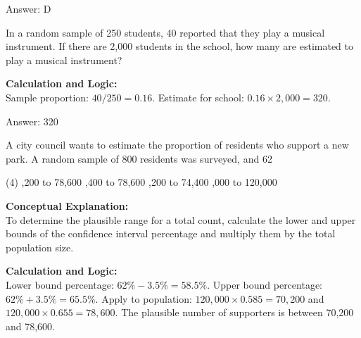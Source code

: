 \documentclass[11pt,paper=a4,answers]{exam}
\begin{document}
\begin{questions}
\begin{solution}
Answer: \colorbox{yellow!100}{D}
\end{solution}

\vspace{60pt}

\question
In a random sample of 250 students, 40 reported that they play a musical instrument. If there are 2,000 students in the school, how many are estimated to play a musical instrument?

\begin{solution}
\textbf{Calculation and Logic:} \\
Sample proportion: $40 / 250 = 0.16$. Estimate for school: $0.16 \times 2,000 = 320$.

\vspace{30pt}

Answer: \colorbox{yellow!100}{320}
\end{solution}


\question
A city council wants to estimate the proportion of residents who support a new park. A random sample of 800 residents was surveyed, and 62%
\begin{tasks}(4)
    ,200 to 78,600
    ,400 to 78,600
    ,200 to 74,400
    ,000 to 120,000
\end{tasks}

\begin{solution}
\textbf{Conceptual Explanation:} \\
To determine the plausible range for a total count, calculate the lower and upper bounds of the confidence interval percentage and multiply them by the total population size.

\vspace{30pt}

\textbf{Calculation and Logic:} \\
Lower bound percentage: $62\% - 3.5\% = 58.5\%$. Upper bound percentage: $62\% + 3.5\% = 65.5\%$. Apply to population: $120,000 \times 0.585 = 70,200$ and $120,000 \times 0.655 = 78,600$. The plausible number of supporters is between 70,200 and 78,600.


\end{solution}
\end{questions}
\end{document}
